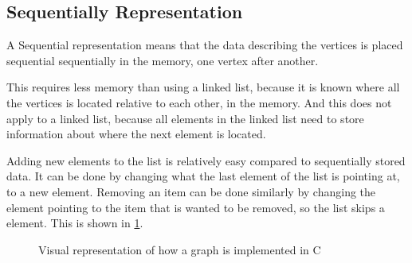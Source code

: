\subsection{Sequentially Representation}
A Sequential representation means that the data describing the vertices is placed sequential sequentially in the memory, one vertex after another. 

This requires less memory than using a linked list, because it is known where all the vertices is located relative to each other, in the memory. And this does not apply to a linked list, because all elements in the linked list need to store information about where the next element is located.

Adding new elements to the list is relatively easy compared to sequentially stored data.
It can be done by changing what the last element of the list is pointing at, to a new element.
Removing an item can be done similarly by changing the element pointing to the item that is wanted to be removed, so the list skips a element. This is shown in \cref{fig:examplegraph}. %

\begin{figure}[h]
\centering
{}
\caption{Visual representation of how a graph is implemented in C} \label{fig:examplegraph}
\end{figure}


